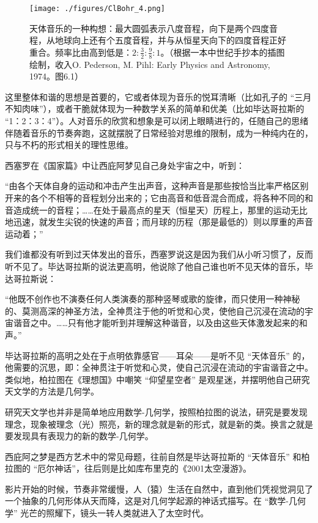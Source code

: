\begin{figure}[ht]
\centering
\texttt{[image: ./figures/ClBohr\_4.png]}
\caption{天体音乐的一种构想：最大圆弧表示八度音程，向下是两个四度音程，从地球向上还有个五度音程，并与从恒星天向下的四度音程正好重合。频率比由高到低是：$2: \frac{3}{2} : \frac{9}{8} : 1$。（根据一本中世纪手抄本的插图绘制，收入O. Pederson, M. Pihl: Early Physics and Astronomy, 1974。图6.1）} \label{ClBohr_fig4}
\end{figure}

这里整体和谐的思想是首要的，它或者体现为音乐的悦耳清晰（比如孔子的 “三月不知肉味”），或者干脆就体现为一种数学关系的简单和优美（比如毕达哥拉斯的 “1：2：3：4”）。人对音乐的欣赏和想象是可以闭上眼睛进行的，任随自己的思绪伴随着音乐的节奏奔跑，这就摆脱了日常经验对思维的限制，成为一种纯内在的，只与不朽的形式相关的理性思维。

西塞罗在《国家篇》中让西庇阿梦见自己身处宇宙之中，听到：

“由各个天体自身的运动和冲击产生出声音，这种声音是那些按恰当比率严格区别开来的各个不相等的音程划分出来的；它由高音和低音混合而成，将各种不同的和音造成统一的音程；……在处于最高点的星天（恒星天）历程上，那里的运动无比地迅速，就发生尖锐的快速的声音；而月球的历程（那是最低的）则以厚重的声音运动着；”

我们谁都没有听到过天体发出的音乐，西塞罗说这是因为我们从小听习惯了，反而听不见了。毕达哥拉斯的说法更高明，他说除了他自己谁也听不见天体的音乐，毕达哥拉斯说：

“他既不创作也不演奏任何人类演奏的那种竖琴或歌的旋律，而只使用一种神秘的、莫测高深的神圣方法，全神贯注于他的听觉和心灵，使他自己沉浸在流动的宇宙谐音之中。……只有他才能听到并理解这种谐音，以及由这些天体激发起来的和声。”

毕达哥拉斯的高明之处在于点明依靠感官——耳朵——是听不见 “天体音乐” 的，他需要的沉思，即：全神贯注于听觉和心灵，使自己沉浸在流动的宇宙谐音之中。类似地，柏拉图在《理想国》中嘲笑 “仰望星空者” 是观星迷，并摆明他自己研究天文学的方法是几何学。

研究天文学也并非是简单地应用数学-几何学，按照柏拉图的说法，研究是要发现理念，现象被理念（光）照亮，新的理念就是新的形式，就是新的类。换言之就是要发现具有表现力的新的数学-几何学。

西庇阿之梦是西方艺术中的常见母题，往前自然是毕达哥拉斯的 “天体音乐” 和柏拉图的 “厄尔神话”，往后则是比如库布里克的《2001太空漫游》。

影片开始的时候，节奏非常缓慢，人（猿）生活在自然中，直到他们凭视觉洞见了一个抽象的几何形体从天而降，这是对几何学起源的神话式描写。在 “数学-几何学” 光芒的照耀下，镜头一转人类就进入了太空时代。


